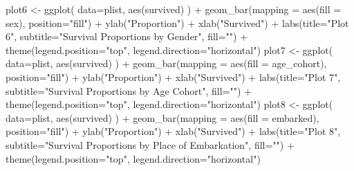 \documentclass[
]{article}
\newenvironment{Shaded}{\begin{snugshade}}{\end{snugshade}}
\newcommand{\AttributeTok}[1]{\textcolor[rgb]{0.77,0.63,0.00}{#1}}
\newcommand{\FunctionTok}[1]{\textcolor[rgb]{0.00,0.00,0.00}{#1}}
\newcommand{\NormalTok}[1]{#1}
\newcommand{\OtherTok}[1]{\textcolor[rgb]{0.56,0.35,0.01}{#1}}
\newcommand{\SpecialCharTok}[1]{\textcolor[rgb]{0.00,0.00,0.00}{#1}}
\newcommand{\StringTok}[1]{\textcolor[rgb]{0.31,0.60,0.02}{#1}}
\begin{document}
\begin{Shaded}
\begin{Highlighting}[]
\NormalTok{plot6 }\OtherTok{\textless{}{-}} \FunctionTok{ggplot}\NormalTok{( }\AttributeTok{data=}\NormalTok{plist, }\FunctionTok{aes}\NormalTok{(survived) ) }\SpecialCharTok{+} \FunctionTok{geom\_bar}\NormalTok{(}\AttributeTok{mapping =} \FunctionTok{aes}\NormalTok{(}\AttributeTok{fill =}\NormalTok{ sex), }\AttributeTok{position=}\StringTok{"fill"}\NormalTok{) }\SpecialCharTok{+} \FunctionTok{ylab}\NormalTok{(}\StringTok{"Proportion"}\NormalTok{) }\SpecialCharTok{+} \FunctionTok{xlab}\NormalTok{(}\StringTok{"Survived"}\NormalTok{) }\SpecialCharTok{+} \FunctionTok{labs}\NormalTok{(}\AttributeTok{title=}\StringTok{"Plot 6"}\NormalTok{, }\AttributeTok{subtitle=}\StringTok{"Survival Proportions by Gender"}\NormalTok{, }\AttributeTok{fill=}\StringTok{""}\NormalTok{) }\SpecialCharTok{+} \FunctionTok{theme}\NormalTok{(}\AttributeTok{legend.position=}\StringTok{"top"}\NormalTok{, }\AttributeTok{legend.direction=}\StringTok{"horizontal"}\NormalTok{)}
\NormalTok{plot7 }\OtherTok{\textless{}{-}} \FunctionTok{ggplot}\NormalTok{( }\AttributeTok{data=}\NormalTok{plist, }\FunctionTok{aes}\NormalTok{(survived) ) }\SpecialCharTok{+} \FunctionTok{geom\_bar}\NormalTok{(}\AttributeTok{mapping =} \FunctionTok{aes}\NormalTok{(}\AttributeTok{fill =}\NormalTok{ age\_cohort), }\AttributeTok{position=}\StringTok{"fill"}\NormalTok{) }\SpecialCharTok{+} \FunctionTok{ylab}\NormalTok{(}\StringTok{"Proportion"}\NormalTok{) }\SpecialCharTok{+} \FunctionTok{xlab}\NormalTok{(}\StringTok{"Survived"}\NormalTok{) }\SpecialCharTok{+} \FunctionTok{labs}\NormalTok{(}\AttributeTok{title=}\StringTok{"Plot 7"}\NormalTok{, }\AttributeTok{subtitle=}\StringTok{"Survival Proportions by Age Cohort"}\NormalTok{, }\AttributeTok{fill=}\StringTok{""}\NormalTok{) }\SpecialCharTok{+} \FunctionTok{theme}\NormalTok{(}\AttributeTok{legend.position=}\StringTok{"top"}\NormalTok{, }\AttributeTok{legend.direction=}\StringTok{"horizontal"}\NormalTok{)}
\NormalTok{plot8 }\OtherTok{\textless{}{-}} \FunctionTok{ggplot}\NormalTok{( }\AttributeTok{data=}\NormalTok{plist, }\FunctionTok{aes}\NormalTok{(survived) ) }\SpecialCharTok{+} \FunctionTok{geom\_bar}\NormalTok{(}\AttributeTok{mapping =} \FunctionTok{aes}\NormalTok{(}\AttributeTok{fill =}\NormalTok{ embarked), }\AttributeTok{position=}\StringTok{"fill"}\NormalTok{) }\SpecialCharTok{+} \FunctionTok{ylab}\NormalTok{(}\StringTok{"Proportion"}\NormalTok{) }\SpecialCharTok{+} \FunctionTok{xlab}\NormalTok{(}\StringTok{"Survived"}\NormalTok{) }\SpecialCharTok{+} \FunctionTok{labs}\NormalTok{(}\AttributeTok{title=}\StringTok{"Plot 8"}\NormalTok{, }\AttributeTok{subtitle=}\StringTok{"Survival Proportions by Place of Embarkation"}\NormalTok{, }\AttributeTok{fill=}\StringTok{""}\NormalTok{) }\SpecialCharTok{+} \FunctionTok{theme}\NormalTok{(}\AttributeTok{legend.position=}\StringTok{"top"}\NormalTok{, }\AttributeTok{legend.direction=}\StringTok{"horizontal"}\NormalTok{)}

\end{Highlighting}
\end{Shaded}
\end{document}
